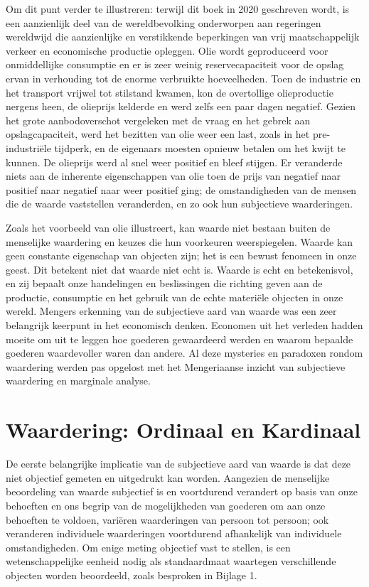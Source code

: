 Om dit punt verder te illustreren: terwijl dit boek in 2020 geschreven wordt, is een aanzienlijk deel van de wereldbevolking onderworpen aan regeringen wereldwijd die aanzienlijke en verstikkende beperkingen van vrij maatschappelijk verkeer en economische productie opleggen. Olie wordt geproduceerd voor onmiddellijke consumptie en er is zeer weinig reservecapaciteit voor de opslag ervan in verhouding tot de enorme verbruikte hoeveelheden. Toen de industrie en het transport vrijwel tot stilstand kwamen, kon de overtollige olieproductie nergens heen, de olieprijs kelderde en werd zelfs een paar dagen negatief. Gezien het grote aanbodoverschot vergeleken met de vraag en het gebrek aan opslagcapaciteit, werd het bezitten van olie weer een last, zoals in het pre-industriële tijdperk, en de eigenaars moesten opnieuw betalen om het kwijt te kunnen. De olieprijs werd al snel weer positief en bleef stijgen. Er veranderde niets aan de inherente eigenschappen van olie toen de prijs van negatief naar positief naar negatief naar weer positief ging; de omstandigheden van de mensen die de waarde vaststellen veranderden, en zo ook hun subjectieve waarderingen.

Zoals het voorbeeld van olie illustreert, kan waarde niet bestaan buiten de menselijke waardering en keuzes die hun voorkeuren weerspiegelen. Waarde kan geen constante eigenschap van objecten zijn; het is een bewust fenomeen in onze geest. Dit betekent niet dat waarde niet echt is. Waarde is echt en betekenisvol, en zij bepaalt onze handelingen en beslissingen die richting geven aan de productie, consumptie en het gebruik van de echte materiële objecten in onze wereld. Mengers erkenning van de subjectieve aard van waarde was een zeer belangrijk keerpunt in het economisch denken. Economen uit het verleden hadden moeite om uit te leggen hoe goederen gewaardeerd werden en waarom bepaalde goederen waardevoller waren dan andere. Al deze mysteries en paradoxen rondom waardering werden pas opgelost met het Mengeriaanse inzicht van subjectieve waardering en marginale analyse.

\section{Waardering: Ordinaal en Kardinaal}

De eerste belangrijke implicatie van de subjectieve aard van waarde is dat deze niet objectief gemeten en uitgedrukt kan worden. Aangezien de menselijke beoordeling van waarde subjectief is en voortdurend verandert op basis van onze behoeften en ons begrip van de mogelijkheden van goederen om aan onze behoeften te voldoen, variëren waarderingen van persoon tot persoon; ook veranderen individuele waarderingen voortdurend afhankelijk van individuele omstandigheden. Om enige meting objectief vast te stellen, is een wetenschappelijke eenheid nodig als standaardmaat waartegen verschillende objecten worden beoordeeld, zoals besproken in Bijlage 1.


